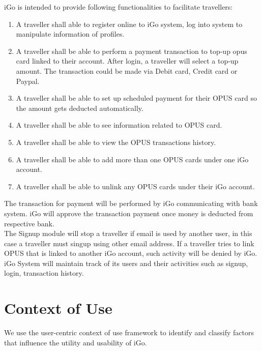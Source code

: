\documentclass[11pt, english]{report}
\begin{document}
iGo is intended to provide following functionalities to facilitate travellers:
\begin{enumerate}
  \item A traveller shall able to register online to iGo system, log into system to manipulate information of profiles.
  \item A traveller shall be able to perform a payment transaction to top-up opus card linked to their account. After login, a traveller will select a top-up amount. The transaction could be made via Debit card, Credit card or Paypal. 
   \item A traveller shall be able to set up scheduled payment for their OPUS card so the amount gets deducted automatically. 
   \item A traveller shall be able to see information related to OPUS card. 
   \item A traveller shall be able to view the OPUS transactions history.
   \item A traveller shall be able to add more than one OPUS cards under one iGo account.
 
   
  \item A traveller shall be able to unlink any OPUS cards under their iGo account.
  
\end{enumerate}

The transaction for payment will be performed by iGo communicating with bank system. iGo will approve the transaction payment once money is deducted from respective bank.\\

The Signup module will stop a traveller if email is used by another user, in this case a traveller must singup using other email address. If a traveller tries to link OPUS that is linked to another iGo account, such activity will be denied by iGo.\\

iGo System will maintain track of its users and their activities such as signup, login, transaction history.

\chapter{Context of Use}
We use the user-centric context of use framework \cite{contextofusecasekamthan}  to identify and classify factors that influence the utility and usability of iGo.\\
\end{document}
